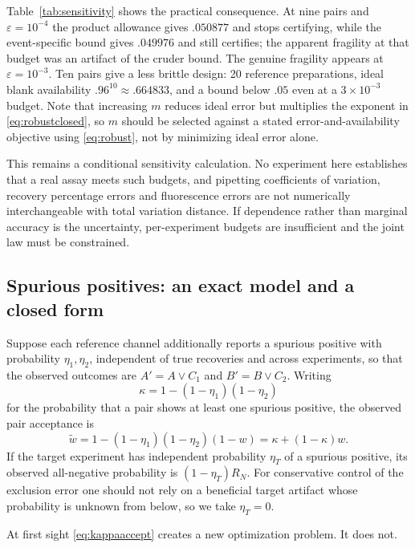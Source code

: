 \documentclass[11pt]{article}
\theoremstyle{remark}\newtheorem{remark}[theorem]{Remark}
\begin{document}
Table~\ref{tab:sensitivity} shows the practical consequence. At nine pairs and
$\varepsilon=10^{-4}$ the product allowance gives $.050877$ and stops
certifying, while the event-specific bound gives $.049976$ and still certifies;
the apparent fragility at that budget was an artifact of the cruder bound. The
genuine fragility appears at $\varepsilon=10^{-3}$. Ten pairs give a less brittle
design: 20 reference preparations, ideal blank availability
$.96^{10}\approx.664833$, and a bound below $.05$ even at a $3\times10^{-3}$
budget. Note that increasing $m$ reduces ideal error but multiplies the exponent
in \eqref{eq:robustclosed}, so $m$ should be selected against a stated
error-and-availability objective using \eqref{eq:robust}, not by minimizing ideal
error alone.

This remains a conditional sensitivity calculation. No experiment here
establishes that a real assay meets such budgets, and pipetting coefficients of
variation, recovery percentage errors and fluorescence errors are not numerically
interchangeable with total variation distance. If dependence rather than marginal
accuracy is the uncertainty, per-experiment budgets are insufficient and the
joint law must be constrained.

\subsection{Spurious positives: an exact model and a closed form}
Suppose each reference channel additionally reports a spurious positive with
probability $\eta_1,\eta_2$, independent of true recoveries and across
experiments, so that the observed outcomes are $A'=A\lor C_1$ and $B'=B\lor C_2$.
Writing
\begin{equation}\label{eq:kappa}
\kappa=1-(1-\eta_1)(1-\eta_2)
\end{equation}
for the probability that a pair shows at least one spurious positive, the
observed pair acceptance is
\begin{equation}\label{eq:kappaaccept}
\widetilde w=1-(1-\eta_1)(1-\eta_2)(1-w)=\kappa+(1-\kappa)w.
\end{equation}
If the target experiment has independent probability $\eta_T$ of a spurious
positive, its observed all-negative probability is $(1-\eta_T)R_N$. For
conservative control of the exclusion error one should not rely on a beneficial
target artifact whose probability is unknown from below, so we take $\eta_T=0$.

At first sight \eqref{eq:kappaaccept} creates a new optimization problem. It does
not.
\end{document}
